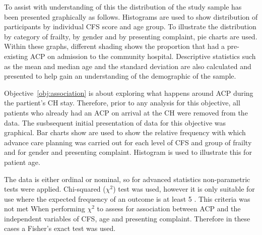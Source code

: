 \documentclass
[
	12pt,
	a4paper,
	oneside,
]{report}
\begin{document}
To assist with understanding of this the distribution of the study sample 
has been presented graphically as follows.
Histograms are used to show distribution of participants by individual 
CFS score and age group.  
To illustrate the distribution by category of frailty, by gender and by presenting 
complaint, pie charts are used. Within these graphs, different shading shows
the proportion that had a pre-existing ACP on admission to the community hospital.
Descriptive statistics such as the mean and median age and the standard deviation
are also calculated and presented to help gain an understanding of the 
demographic of the sample.

Objective~\ref{obj:association} is about exploring what happens around ACP
during the partient's CH stay. Therefore, prior to any analysis for this 
objective, all patients who already had an ACP on arrival at the CH were
removed from the data.
The susbsequent initial presentation of data for this objective was
graphical. Bar charts show are used to show the relative frequency with which 
advance care planning
was carried out for each level of CFS and group of frailty and for gender and
presenting complaint. Histogram is used to illustrate this for patient age.

The data is either ordinal or nominal, so for advanced statistics
non-parametric tests were applied. Chi-squared ($\chi^2$) test was used, 
however it is only
suitable for use where the expected frequency of an outcome is at least 5
\parencite[page 690]{field:09}. This criteria was not met When performing 
$\chi^2$ to assess for association between ACP and the independent variables 
of CFS, age and presenting complaint. Therefore in these cases a Fisher's exact
test was used.

%
%

%
%
\end{document}
